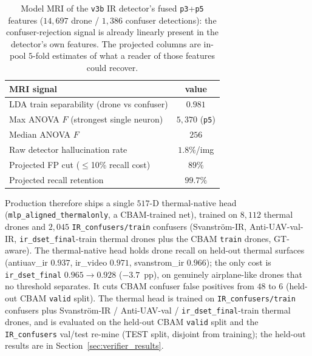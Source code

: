 \begin{table}[htbp]
    \centering
    \caption{Model MRI of the \texttt{v3b} IR detector's fused \texttt{p3}+\texttt{p5} features ($14{,}697$ drone / $1{,}386$ confuser detections): the confuser-rejection signal is already linearly present in the detector's own features. The projected columns are in-pool $5$-fold estimates of what a reader of those features could recover.}
    \label{tab:ir_mri_sep}
    \begin{tabular}{lc}
        \toprule
        MRI signal & value \\
        \midrule
        LDA train separability (drone vs confuser) & $0.981$ \\
        Max ANOVA $F$ (strongest single neuron) & $5{,}370$ (\texttt{p5}) \\
        Median ANOVA $F$ & $256$ \\
        Raw detector hallucination rate & $1.8\%$/img \\
        Projected FP cut ($\leq$10\% recall cost) & $89\%$ \\
        Projected recall retention & $99.7\%$ \\
        \bottomrule
    \end{tabular}
\end{table}

Production therefore ships a single $517$-D thermal-native head (\texttt{mlp\_aligned\_\allowbreak thermalonly}, a CBAM-trained net), trained on $8{,}112$ thermal drones and $2{,}045$ \texttt{IR\_confusers/train} confusers (Svanstr\"om-IR, Anti-UAV-val-IR, \texttt{ir\_dset\_final}-train thermal drones plus the CBAM \texttt{train} drones, GT-aware). The thermal-native head holds drone recall on held-out thermal surfaces (antiuav\_ir $0.937$, ir\_video $0.971$, svanstrom\_ir $0.966$); the only cost is \texttt{ir\_dset\_final} $0.965 \to 0.928$ ($-3.7$~pp), on genuinely airplane-like drones that no threshold separates. It cuts CBAM confuser false positives from $48$ to $6$ (held-out CBAM \texttt{valid} split). The thermal head is trained on \texttt{IR\_confusers/train} confusers plus Svanstr\"om-IR / Anti-UAV-val / \texttt{ir\_dset\_final}-train thermal drones, and is evaluated on the held-out CBAM \texttt{valid} split and the \texttt{IR\_confusers} val/test re-mine (TEST split, disjoint from training); the held-out results are in Section~\ref{sec:verifier_results}.

